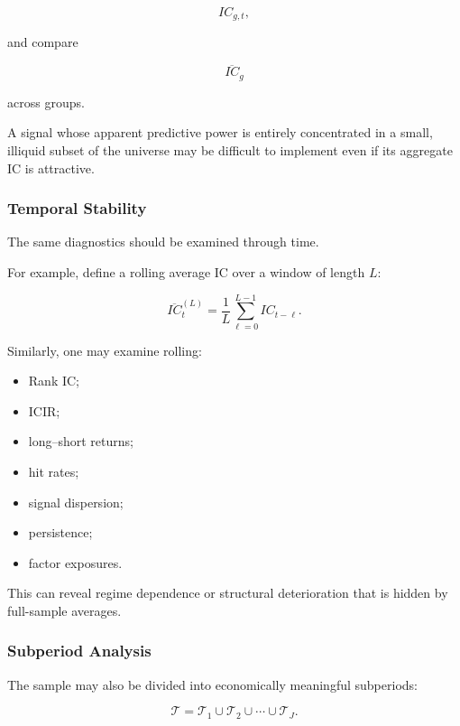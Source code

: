 \documentclass[11pt,a4paper]{article}
\begin{document}
\begin{equation}
IC_{g,t},
\end{equation}

and compare

\begin{equation}
\overline{IC}_g
\end{equation}

across groups.

A signal whose apparent predictive power is entirely concentrated in a small,
illiquid subset of the universe may be difficult to implement even if its
aggregate IC is attractive.


\subsubsection{Temporal Stability}

The same diagnostics should be examined through time.

For example, define a rolling average IC over a window of length $L$:

\begin{equation}
\boxed{
\overline{IC}_{t}^{(L)}
=
\frac{1}{L}
\sum_{\ell=0}^{L-1}
IC_{t-\ell}.
}
\end{equation}

Similarly, one may examine rolling:

\begin{itemize}
    \item Rank IC;
    \item ICIR;
    \item long--short returns;
    \item hit rates;
    \item signal dispersion;
    \item persistence;
    \item factor exposures.
\end{itemize}

This can reveal regime dependence or structural deterioration that is hidden by
full-sample averages.


\subsubsection{Subperiod Analysis}

The sample may also be divided into economically meaningful subperiods:

\begin{equation}
\mathcal{T}
=
\mathcal{T}_1
\cup
\mathcal{T}_2
\cup
\cdots
\cup
\mathcal{T}_J.
\end{equation}
\end{document}
